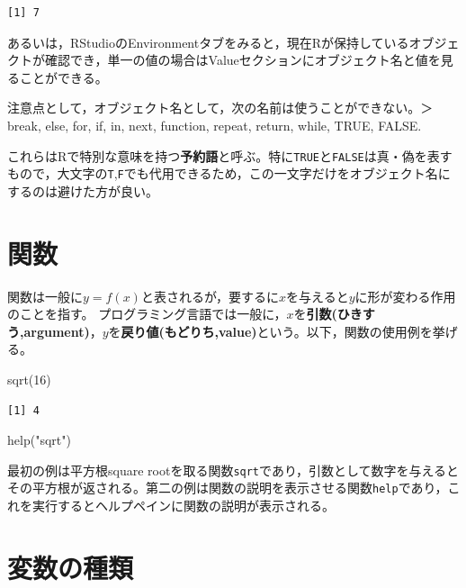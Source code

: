\documentclass[
  a4paper,
]{ltjsbook}
\newenvironment{Shaded}{\begin{snugshade}}{\end{snugshade}}
\newcommand{\DecValTok}[1]{\textcolor[rgb]{0.68,0.00,0.00}{#1}}
\newcommand{\FunctionTok}[1]{\textcolor[rgb]{0.28,0.35,0.67}{#1}}
\newcommand{\NormalTok}[1]{\textcolor[rgb]{0.00,0.23,0.31}{#1}}
\newcommand{\StringTok}[1]{\textcolor[rgb]{0.13,0.47,0.30}{#1}}
\begin{document}
\begin{verbatim}
[1] 7
\end{verbatim}

あるいは，RStudioのEnvironmentタブをみると，現在Rが保持しているオブジェクトが確認でき，単一の値の場合はValueセクションにオブジェクト名と値を見ることができる。

注意点として，オブジェクト名として，次の名前は使うことができない。＞
break, else, for, if, in, next, function, repeat, return, while, TRUE,
FALSE.

これらはRで特別な意味を持つ\textbf{予約語}と呼ぶ。特に\texttt{TRUE}と\texttt{FALSE}は真・偽を表すもので，大文字の\texttt{T},\texttt{F}でも代用できるため，この一文字だけをオブジェクト名にするのは避けた方が良い。

\section{関数}\label{ux95a2ux6570}

関数は一般に\(y=f(x)\)と表されるが，要するに\(x\)を与えると\(y\)に形が変わる作用のことを指す。
プログラミング言語では一般に，\(x\)を\textbf{引数(ひきすう,argument)}，\(y\)を\textbf{戻り値(もどりち,value)}という。以下，関数の使用例を挙げる。

\begin{Shaded}
\begin{Highlighting}[]
\FunctionTok{sqrt}\NormalTok{(}\DecValTok{16}\NormalTok{)}
\end{Highlighting}
\end{Shaded}

\begin{verbatim}
[1] 4
\end{verbatim}

\begin{Shaded}
\begin{Highlighting}[]
\FunctionTok{help}\NormalTok{(}\StringTok{"sqrt"}\NormalTok{)}
\end{Highlighting}
\end{Shaded}

最初の例は平方根square
rootを取る関数\texttt{sqrt}であり，引数として数字を与えるとその平方根が返される。第二の例は関数の説明を表示させる関数\texttt{help}であり，これを実行するとヘルプペインに関数の説明が表示される。

\section{変数の種類}\label{ux5909ux6570ux306eux7a2eux985e}
\end{document}

